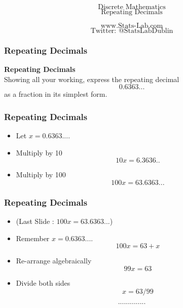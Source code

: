 \documentclass{beamer}
\begin{document}
\begin{frame}

\huge
\[ \mbox{Discrete Mathematics}\]
\[ \mbox{Repeating Decimals}\]

\Large
\[ \mbox{www.Stats-Lab.com}\]
\[ \mbox{Twitter: @StatsLabDublin}\]

\end{frame}
\begin{frame}
\frametitle{Repeating Decimals}
\Large
\vspace{-3cm}
\textbf{Repeating Decimals}\\

Showing all your working, express the repeating decimal
\[0.6363...\]
as a fraction in its simplest form.

\end{frame}
\begin{frame}
\frametitle{Repeating Decimals}
\Large
\begin{itemize}
\item Let $x = 0.6363....$
\item Multiply by 10 \[10x = 6.3636..\]
\item Multiply by 100 \[100x = 63.6363...\]
\end{itemize}
\end{frame}
\begin{frame}
\frametitle{Repeating Decimals}
\Large
\begin{itemize}
\item (Last Slide : $100x = 63.6363...$)
\item Remember $x = 0.6363....$ 
\[100x = 63 + x\]
\item Re-arrange algebraically
\[99x = 63\]
\item Divide both sides
\[ x = 63/99\]
\end{itemize}
\end{frame}


\begin{frame}
\[..............\]
\end{frame}
\end{document}
